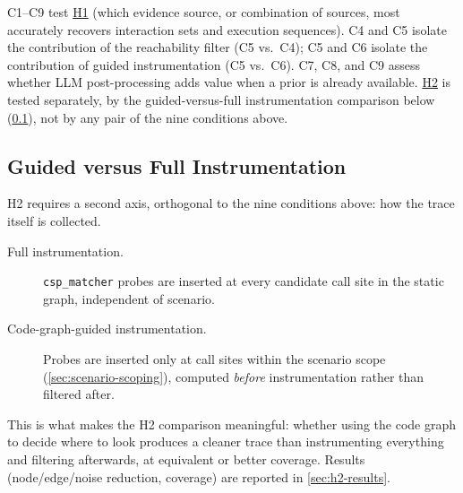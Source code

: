 C1--C9 test \hyperref[sec:h1]{H1} (which evidence source, or combination
of sources, most accurately recovers interaction sets and execution
sequences). C4 and C5 isolate the contribution of the reachability
filter (C5 vs.~C4); C5 and C6 isolate the contribution of guided
instrumentation (C5 vs.~C6). C7, C8, and C9 assess whether \ac{LLM}
post-processing adds value when a prior is already available.
\hyperref[sec:h2]{H2} is tested separately, by the
guided-versus-full instrumentation comparison below
(\cref{sec:guided-vs-full}), not by any pair of the nine conditions
above.

\subsection{Guided versus Full Instrumentation}\label{sec:guided-vs-full}

H2 requires a second axis, orthogonal to the nine conditions above: how
the trace itself is collected.

\begin{description}
  \item[Full instrumentation.] \texttt{csp\_matcher} probes are inserted
    at every candidate call site in the static graph, independent of
    scenario.
  \item[Code-graph-guided instrumentation.] Probes are inserted only at
    call sites within the scenario scope (\cref{sec:scenario-scoping}),
    computed \emph{before} instrumentation rather than filtered after.
\end{description}

This is what makes the H2 comparison meaningful: whether using the code
graph to decide where to look produces a cleaner trace than
instrumenting everything and filtering afterwards, at equivalent or
better coverage. Results (node/edge/noise reduction, coverage) are
reported in \cref{sec:h2-results}.

